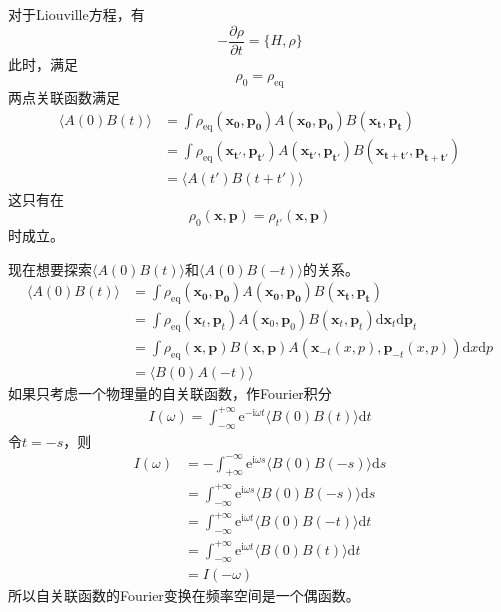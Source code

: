 \documentclass[12pt]{article}
\begin{document}
    对于Liouville方程，有
    \begin{equation}
    -\frac {\partial \rho}{\partial t} = \{H,\rho\}
    \end{equation}
    此时，满足
    \begin{equation}
    \rho_0 = \rho_{\mathrm{eq}}
    \end{equation}
    两点关联函数满足
    \begin{equation}\begin{aligned}
    \langle A(0)B(t) \rangle &= \int \rho_{\mathrm{eq}} (\bm{x_0},\bm{p_0}) A(\bm{x_0},\bm{p_0}) B(\bm{x_t}, \bm{p_t})\\
    &= \int \rho_{\mathrm{eq}} (\bm{x_{t'}},\bm{p_{t'}}) A(\bm{x_{t'}},\bm{p_{t'}}) B(\bm{x_{t+t'}}, \bm{p_{t + t'}})\\
    &= \langle A(t')B(t+t') \rangle
    \end{aligned}\end{equation}
    这只有在
    \begin{equation}
    \rho_0(\bm{x},\bm{p}) = \rho_{t'}(\bm{x},\bm{p})
    \end{equation}
    时成立。

    现在想要探索$\langle A(0)B(t) \rangle$和$\langle A(0)B(-t) \rangle$的关系。
    \begin{equation}\begin{aligned}
    \langle A(0)B(t) \rangle &= \int \rho_{\mathrm{eq}} (\bm{x_0},\bm{p_0}) A(\bm{x_0},\bm{p_0}) B(\bm{x_t}, \bm{p_t})\\
    &= \int \rho_{\mathrm{eq}}(\bm x_t, \bm p_t) A(\bm x_0,\bm p_0)B(\bm x_t, \bm p_t) \mathrm{d}\bm x_t \mathrm{d} \bm p_t\\
    &= \int \rho_{\mathrm{eq}}(\bm x, \bm p)B(\bm x, \bm p) A(\bm x_{-t}(x,p), \bm p_{-t}(x,p))\mathrm{d}x\mathrm{d}p\\
    &= \langle B(0)A(-t) \rangle
    \end{aligned}\end{equation}
    如果只考虑一个物理量的自关联函数，作Fourier积分
    \begin{equation}\begin{aligned}
    I(\omega) = \int_{-\infty}^{+\infty} \mathrm{e}^{-\mathrm{i}\omega t} \langle B(0)B(t) \rangle \mathrm{d}t
    \end{aligned}\end{equation}
    令$t=-s$，则
    \begin{equation}\begin{aligned}
    I(\omega) &= -\int_{+\infty}^{-\infty} \mathrm{e}^{\mathrm{i}\omega s} \langle B(0)B(-s) \rangle \mathrm{d}s\\
    &= \int_{-\infty}^{+\infty} \mathrm{e}^{\mathrm{i}\omega s} \langle B(0)B(-s) \rangle \mathrm{d}s\\
    &= \int_{-\infty}^{+\infty} \mathrm{e}^{\mathrm{i}\omega t} \langle B(0)B(-t) \rangle \mathrm{d}t\\
    &= \int_{-\infty}^{+\infty} \mathrm{e}^{\mathrm{i}\omega t} \langle B(0)B(t) \rangle \mathrm{d}t\\
    &= I(-\omega)
    \end{aligned}\end{equation}
    所以自关联函数的Fourier变换在频率空间是一个偶函数。
\end{document}
